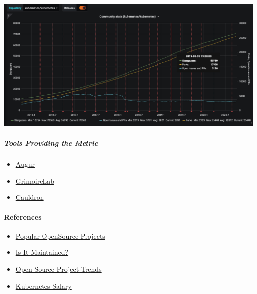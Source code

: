 \includegraphics{images/project-popularity_kubernetes.png}

\hypertarget{tools-providing-the-metric}{%
\subparagraph{Tools Providing the
Metric}\label{tools-providing-the-metric}}

\begin{itemize}
\tightlist
\item
  \href{https://github.com/chaoss/augur}{Augur}
\item
  \href{https://chaoss.github.io/grimoirelab/}{GrimoireLab}
\item
  \href{https://cauldron.io/}{Cauldron}
\end{itemize}

\hypertarget{references}{%
\paragraph{References}\label{references}}

\begin{itemize}
\tightlist
\item
  \href{http://blog.honeypot.io/most-exciting-open-source-projects-2018/}{Popular
  OpenSource Projects}
\item
  \href{https://isitmaintained.com/}{Is It Maintained?}
\item
  \href{https://github.blog/2018-02-08-open-source-project-trends-for-2018/}{Open
  Source Project Trends}
\item
  \href{https://www.payscale.com/research/US/Skill=Kubernetes/Salary}{Kubernetes
  Salary}
\end{itemize}
